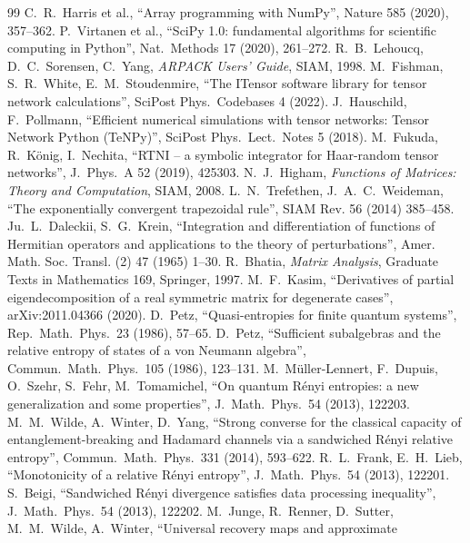 \documentclass[11pt]{article}
\begin{document}
{\begin{thebibliography}{99}
 C.~R.~Harris et al., ``Array programming with NumPy'', Nature 585 (2020), 357--362.
 P.~Virtanen et al., ``SciPy 1.0: fundamental algorithms for scientific computing in Python'',
  Nat.\ Methods 17 (2020), 261--272.
 R.~B.~Lehoucq, D.~C.~Sorensen, C.~Yang, \emph{ARPACK Users' Guide}, SIAM, 1998.
 M.~Fishman, S.~R.~White, E.~M.~Stoudenmire, ``The ITensor software library for tensor network
  calculations'', SciPost Phys.\ Codebases 4 (2022).
 J.~Hauschild, F.~Pollmann, ``Efficient numerical simulations with tensor networks: Tensor
  Network Python (TeNPy)'', SciPost Phys.\ Lect.\ Notes 5 (2018).
 M.~Fukuda, R.~K\"onig, I.~Nechita, ``RTNI -- a symbolic integrator for Haar-random tensor
  networks'', J.\ Phys.\ A 52 (2019), 425303.
 N.~J.~Higham, \emph{Functions of Matrices: Theory and Computation}, SIAM, 2008.
 L.~N.~Trefethen, J.~A.~C.~Weideman, ``The exponentially convergent trapezoidal rule'',
SIAM Rev. 56 (2014) 385--458.
 Ju.~L.~Daleckii, S.~G.~Krein, ``Integration and differentiation of functions of Hermitian
operators and applications to the theory of perturbations'', Amer. Math. Soc. Transl. (2) 47 (1965) 1--30.
 R.~Bhatia, \emph{Matrix Analysis}, Graduate Texts in Mathematics 169, Springer, 1997.
 M.~F.~Kasim, ``Derivatives of partial eigendecomposition of a real symmetric matrix for
degenerate cases'', arXiv:2011.04366 (2020).
 D.~Petz, ``Quasi-entropies for finite quantum systems'', Rep.\ Math.\ Phys.\ 23 (1986), 57--65.
 D.~Petz, ``Sufficient subalgebras and the relative entropy of states of a von Neumann
  algebra'', Commun.\ Math.\ Phys.\ 105 (1986), 123--131.
 M.~M\"uller-Lennert, F.~Dupuis, O.~Szehr, S.~Fehr, M.~Tomamichel, ``On quantum R\'enyi
  entropies: a new generalization and some properties'', J.\ Math.\ Phys.\ 54 (2013), 122203.
 M.~M.~Wilde, A.~Winter, D.~Yang, ``Strong converse for the classical capacity of
  entanglement-breaking and Hadamard channels via a sandwiched R\'enyi relative entropy'', Commun.\ Math.\ Phys.\ 331
  (2014), 593--622.
 R.~L.~Frank, E.~H.~Lieb, ``Monotonicity of a relative R\'enyi entropy'', J.\ Math.\ Phys.\ 54
  (2013), 122201.
 S.~Beigi, ``Sandwiched R\'enyi divergence satisfies data processing inequality'', J.\ Math.\
  Phys.\ 54 (2013), 122202.
 M.~Junge, R.~Renner, D.~Sutter, M.~M.~Wilde, A.~Winter, ``Universal recovery maps and approximate

\end{thebibliography}}
\end{document}
